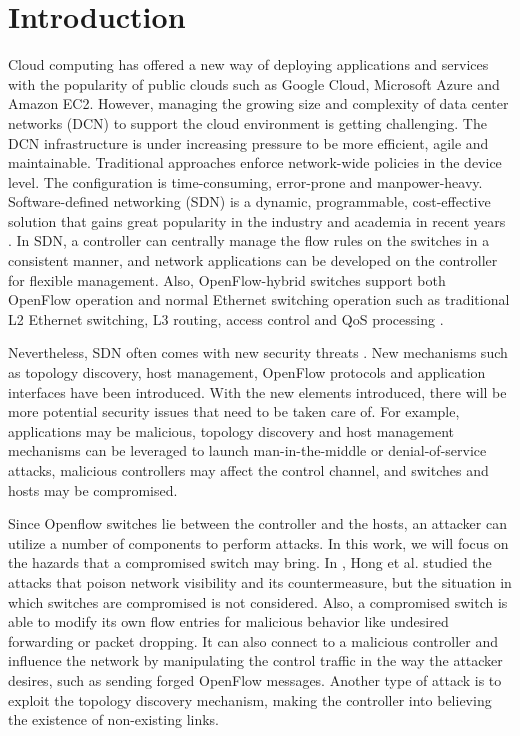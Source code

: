 \chapter{Introduction}
\label{chap:intro}
\setcounter{page}{1}

Cloud computing has offered a new way of deploying applications and services with the popularity of public clouds such as Google Cloud, Microsoft Azure and Amazon EC2. However, managing the growing size and complexity of data center networks (DCN) to support the cloud environment is getting challenging. The DCN infrastructure is under increasing pressure to be more efficient, agile and maintainable. Traditional approaches enforce network-wide policies in the device level. The configuration is time-consuming, error-prone and manpower-heavy. Software-defined networking (SDN) is a dynamic, programmable, cost-effective solution that gains great popularity in the industry and academia in recent years \cite{KRVRAU15, MABPPRST08, LHM10}. In SDN, a controller can centrally manage the flow rules on the switches in a consistent manner, and network applications can be developed on the controller for flexible management. Also, OpenFlow-hybrid switches support both OpenFlow operation and normal Ethernet switching operation such as traditional L2 Ethernet switching, L3 routing, access control and QoS processing \cite{OF_SPEC}.

Nevertheless, SDN often comes with new security threats \cite{SOS13,CM}. New mechanisms such as topology discovery, host management, OpenFlow protocols and application interfaces have been introduced. With the new elements introduced, there will be more potential security issues that need to be taken care of. For example, applications may be malicious, topology discovery and host management mechanisms can be leveraged to launch man-in-the-middle or denial-of-service attacks, malicious controllers may affect the control channel, and switches and hosts may be compromised.

Since Openflow switches lie between the controller and the hosts, an attacker can utilize a number of components to perform attacks. In this work, we will focus on the hazards that a compromised switch may bring. In \cite{HXWG15}, Hong et al. studied the attacks that poison network visibility and its countermeasure, but the situation in which switches are compromised is not considered. Also, a compromised switch is able to modify its own flow entries for malicious behavior like undesired forwarding or packet dropping. It can also connect to a malicious controller and influence the network by manipulating the control traffic in the way the attacker desires, such as sending forged OpenFlow messages. Another type of attack is to exploit the topology discovery mechanism, making the controller into believing the existence of non-existing links.

